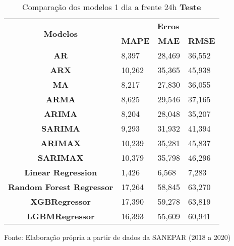 \begin{table}[H]
	\centering
	\caption{Comparação dos modelos 1 dia a frente 24h \textbf{Teste} }\label{tb:1-24tst}
	\begin{tabular}{@{}clll@{}}
		\toprule
		\multirow{2}{*}{\textbf{Modelos}} & \multicolumn{3}{c}{\textbf{Erros}}                                                                       \\ \cmidrule(l){2-4} 
		& \multicolumn{1}{c}{\textbf{MAPE}} & \multicolumn{1}{c}{\textbf{MAE}} & \multicolumn{1}{c}{\textbf{RMSE}} \\ \hline
\textbf{AR}                       & 8,397                             & 28,469                           & 36,552                            \\
\textbf{ARX}                      & 10,262                            & 35,365                           & 45,938                            \\
\textbf{MA}                       & 8,217                             & 27,830                           & 36,055                            \\
\textbf{ARMA}                     & 8,625                             & 29,546                           & 37,165                            \\
\textbf{ARIMA}                    & 8,204                             & 28,048                           & 35,207                            \\
\textbf{SARIMA}                   & 9,293                             & 31,932                           & 41,394                            \\
\textbf{ARIMAX}                   & 10,239                            & 35,281                           & 45,837                            \\
\textbf{SARIMAX}                  & 10,379                            & 35,798                           & 46,296                            \\
\textbf{Linear Regression}        & 1,426                             & 6,568                            & 7,283                             \\
\textbf{Random Forest Regressor}  & 17,264                            & 58,845                           & 63,270                            \\
\textbf{XGBRegressor}             & 17,390                            & 59,278                           & 63,819                            \\
\textbf{LGBMRegressor}            & 16,393                            & 55,609                           & 60,941                            \\ \bottomrule
	\end{tabular}

Fonte: Elaboração própria a partir de dados da SANEPAR (2018 a 2020)
\end{table}

